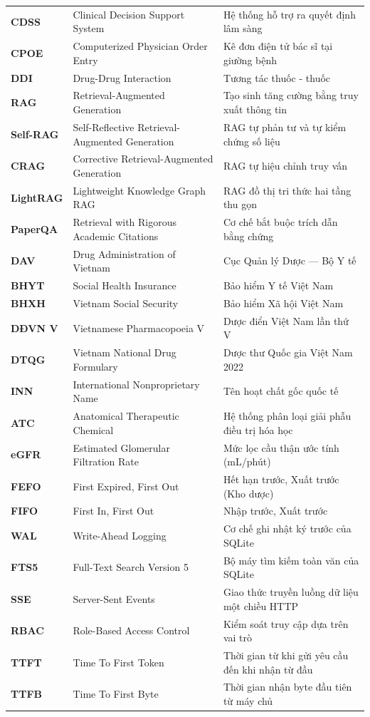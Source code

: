 \begin{longtable}{L{3.2cm} L{7.5cm} L{4.5cm}}
\textbf{CDSS} & Clinical Decision Support System & Hệ thống hỗ trợ ra quyết định lâm sàng \\
\textbf{CPOE} & Computerized Physician Order Entry & Kê đơn điện tử bác sĩ tại giường bệnh \\
\textbf{DDI} & Drug-Drug Interaction & Tương tác thuốc - thuốc \\
\textbf{RAG} & Retrieval-Augmented Generation & Tạo sinh tăng cường bằng truy xuất thông tin \\
\textbf{Self-RAG} & Self-Reflective Retrieval-Augmented Generation & RAG tự phản tư và tự kiểm chứng số liệu \\
\textbf{CRAG} & Corrective Retrieval-Augmented Generation & RAG tự hiệu chỉnh truy vấn \\
\textbf{LightRAG} & Lightweight Knowledge Graph RAG & RAG đồ thị tri thức hai tầng thu gọn \\
\textbf{PaperQA} & Retrieval with Rigorous Academic Citations & Cơ chế bắt buộc trích dẫn bằng chứng \\
\textbf{DAV} & Drug Administration of Vietnam & Cục Quản lý Dược --- Bộ Y tế \\
\textbf{BHYT} & Social Health Insurance & Bảo hiểm Y tế Việt Nam \\
\textbf{BHXH} & Vietnam Social Security & Bảo hiểm Xã hội Việt Nam \\
\textbf{DĐVN V} & Vietnamese Pharmacopoeia V & Dược điển Việt Nam lần thứ V \\
\textbf{DTQG} & Vietnam National Drug Formulary & Dược thư Quốc gia Việt Nam 2022 \\
\textbf{INN} & International Nonproprietary Name & Tên hoạt chất gốc quốc tế \\
\textbf{ATC} & Anatomical Therapeutic Chemical & Hệ thống phân loại giải phẫu điều trị hóa học \\
\textbf{eGFR} & Estimated Glomerular Filtration Rate & Mức lọc cầu thận ước tính (mL/phút) \\
\textbf{FEFO} & First Expired, First Out & Hết hạn trước, Xuất trước (Kho dược) \\
\textbf{FIFO} & First In, First Out & Nhập trước, Xuất trước \\
\textbf{WAL} & Write-Ahead Logging & Cơ chế ghi nhật ký trước của SQLite \\
\textbf{FTS5} & Full-Text Search Version 5 & Bộ máy tìm kiếm toàn văn của SQLite \\
\textbf{SSE} & Server-Sent Events & Giao thức truyền luồng dữ liệu một chiều HTTP \\
\textbf{RBAC} & Role-Based Access Control & Kiểm soát truy cập dựa trên vai trò \\
\textbf{TTFT} & Time To First Token & Thời gian từ khi gửi yêu cầu đến khi nhận từ đầu \\
\textbf{TTFB} & Time To First Byte & Thời gian nhận byte đầu tiên từ máy chủ \\
\end{longtable}
